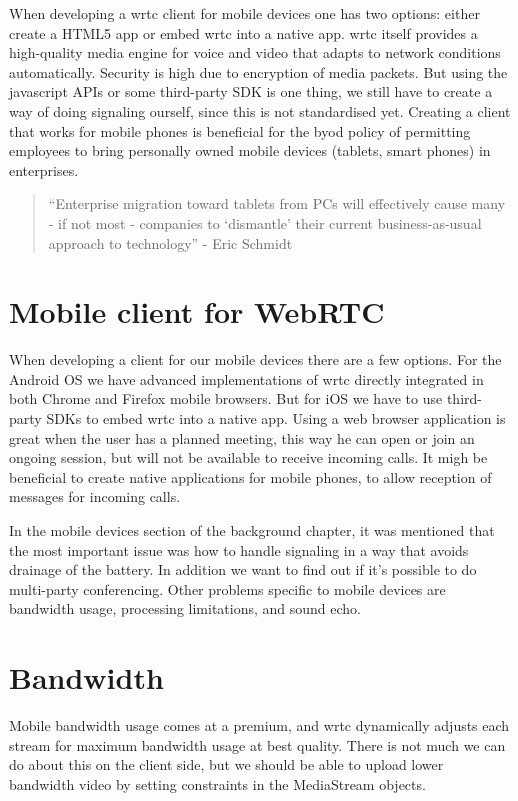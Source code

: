 When developing a \gls{wrtc} client for mobile devices one has two options: either create a HTML5 app or embed \gls{wrtc} into a native app. \gls{wrtc} itself provides a high-quality media engine for voice and video that adapts to network conditions automatically. Security is high due to encryption of media packets. But using the javascript APIs or some third-party SDK is one thing, we still have to create a way of doing signaling ourself, since this is not standardised yet. Creating a client that works for mobile phones is beneficial for the \gls{byod} policy of permitting employees to bring personally owned mobile devices (tablets, smart phones) in enterprises.

\begin{quote}
``Enterprise migration toward tablets from PCs will effectively cause many - if not most - companies to `dismantle' their current business-as-usual approach to technology'' - Eric Schmidt
\end{quote}


\section{Mobile client for WebRTC}
When developing a client for our mobile devices there are a few options. For the Android OS we have advanced implementations of \gls{wrtc} directly integrated in both Chrome and Firefox mobile browsers. But for iOS we have to use third-party SDKs to embed \gls{wrtc} into a native app. Using a web browser application is great when the user has a planned meeting, this way he can open or join an ongoing session, but will not be available to receive incoming calls. It migh be beneficial to create native applications for mobile phones, to allow reception of messages for incoming calls.

In the mobile devices section of the background chapter, it was mentioned that the most important issue was how to handle signaling in a way that avoids drainage of the battery. In addition we want to find out if it's possible to do multi-party conferencing. Other problems specific to mobile devices are bandwidth usage, processing limitations, and sound echo.

\section{Bandwidth}
Mobile bandwidth usage comes at a premium, and \gls{wrtc} dynamically adjusts each stream for maximum bandwidth usage at best quality. There is not much we can do about this on the client side, but we should be able to upload lower bandwidth video by setting constraints in the MediaStream objects. 


